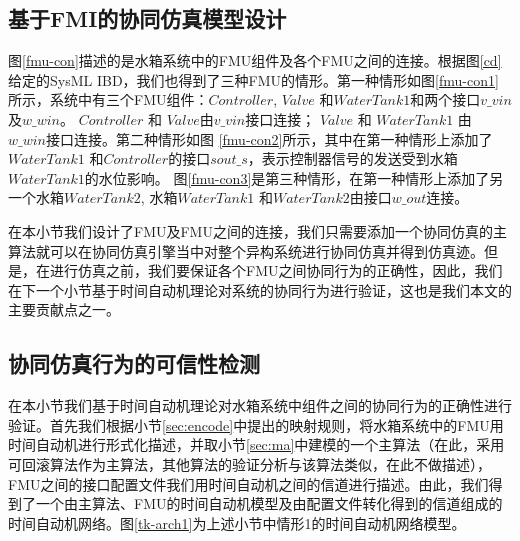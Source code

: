 \subsection{基于FMI的协同仿真模型设计} 
\label{sec:case}
图\ref{fmu-con}描述的是水箱系统中的FMU组件及各个FMU之间的连接。根据图\ref{cd}给定的SysML IBD，我们也得到了三种FMU的情形。第一种情形如图\ref{fmu-con1}所示，系统中有三个FMU组件：$Controller$, $Valve$ 和$WaterTank1$和两个接口$v \_ vin$及$w \_ win$。 $Controller$ 和 $Valve$由$v \_ vin$接口连接； $Valve$ 和 $WaterTank1$ 由 $w \_ win$接口连接。第二种情形如图 \ref{fmu-con2}所示，其中在第一种情形上添加了$WaterTank1$ 和$Controller$的接口$sout \_ s$，表示控制器信号的发送受到水箱$WaterTank1$的水位影响。 图\ref{fmu-con3}是第三种情形，在第一种情形上添加了另一个水箱$WaterTank2$, 水箱$WaterTank1$ 和$WaterTank2$由接口$w \_ out$连接。 
\begin{figure}[htbp]
\end{figure}

在本小节我们设计了FMU及FMU之间的连接，我们只需要添加一个协同仿真的主算法就可以在协同仿真引擎当中对整个异构系统进行协同仿真并得到仿真迹。但是，在进行仿真之前，我们要保证各个FMU之间协同行为的正确性，因此，我们在下一个小节基于时间自动机理论对系统的协同行为进行验证，这也是我们本文的主要贡献点之一。
\subsection{协同仿真行为的可信性检测} 
\label{sec:mauppaal}
在本小节我们基于时间自动机理论对水箱系统中组件之间的协同行为的正确性进行验证。首先我们根据小节\ref{sec:encode}中提出的映射规则，将水箱系统中的FMU用时间自动机进行形式化描述，并取小节\ref{sec:ma}中建模的一个主算法（在此，采用可回滚算法作为主算法，其他算法的验证分析与该算法类似，在此不做描述），FMU之间的接口配置文件我们用时间自动机之间的信道进行描述。由此，我们得到了一个由主算法、FMU的时间自动机模型及由配置文件转化得到的信道组成的时间自动机网络。图\ref{tk-arch1}为上述小节中情形1的时间自动机网络模型。

